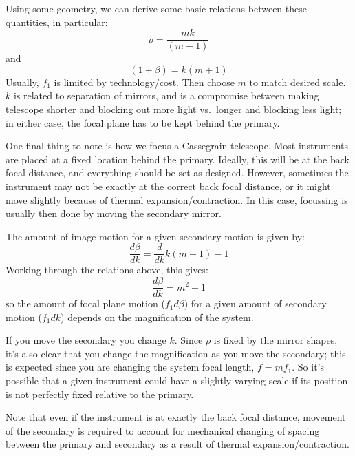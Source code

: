 \documentclass[12pt]{article}
\begin{document}
Using some geometry, we can derive some basic relations between these
quantities, in particular:
    $$ \rho = \frac{mk}{(m-1)}  $$
and
    $$ (1+\beta) = k(m+1)  $$
Usually, $f_1$ is limited by technology/cost. Then choose $m$ to match
desired scale. $k$ is related to separation of mirrors, and is a
compromise between making telescope shorter and blocking out more
light vs.\ longer and blocking less light; in either case,
the focal plane has to be kept behind the primary.

One final thing to note is how we focus a Cassegrain telescope. Most
instruments are placed at a fixed location behind the primary.
Ideally, this will be at the back focal distance, and everything
should be set as designed. However, sometimes the instrument may not
be exactly at the correct back focal distance, or it might move
slightly because of thermal expansion/contraction. In this case,
focussing is usually then done by moving the secondary mirror.

The amount of image motion for a given secondary motion is given by:
    $$ \frac{d\beta}{dk} = \frac{d}{dk}k(m+1)-1 $$
Working through the relations above, this gives:
    $$ \frac{d\beta}{dk} = m^{2}+1  $$
so the amount of focal plane motion ($f_{1}d\beta$) for a given amount
of secondary motion ($f_{1}dk$) depends on the magnification of the
system.

If you move the secondary you change $k$. Since $\rho$ is fixed by the
mirror shapes, it's also clear that you change the magnification as
you move the secondary; this is expected since you are changing the
system focal length, $f = mf_{1}$. So it's possible that a given
instrument could have a slightly varying scale if its position is not
perfectly fixed relative to the primary.

Note that even if the instrument is at exactly the back focal
distance, movement of the secondary is required to account for
mechanical changing of spacing between the primary and secondary as a
result of thermal expansion/contraction.

\end{document}
